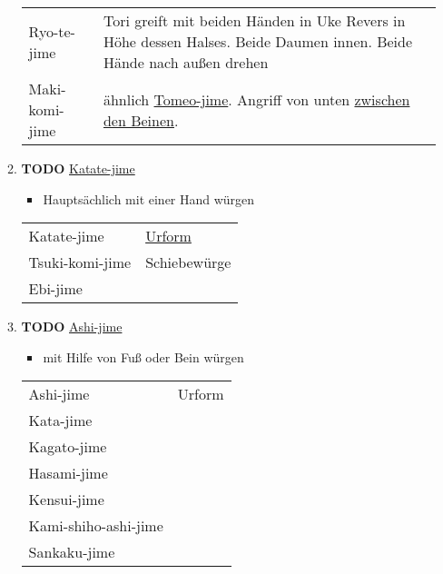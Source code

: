 \documentclass[11pt]{article}
\begin{document}
\begin{enumerate}
\begin{enumerate}
\begin{center}
\begin{tabular}{ll}
\label{org4d43bbc}Ryo-te-jime & Tori greift mit beiden Händen in Uke Revers in Höhe dessen Halses. Beide Daumen innen. Beide Hände nach außen drehen\\
\label{orgaf130ed}Maki-komi-jime & ähnlich \hyperref[org76eba16]{Tomeo-jime}. Angriff von unten \hyperref[orgd3451e7]{zwischen den Beinen}.\\
\end{tabular}
\end{center}

\item {\bfseries\sffamily TODO} \hyperref[org5205198]{Katate-jime}
\label{sec:orgaaa1370}

\begin{itemize}
\item Hauptsächlich mit einer Hand würgen
\end{itemize}

\begin{center}
\begin{tabular}{ll}
\label{org5205198}Katate-jime & \href{https://www.youtube.com/watch?v=aKEQKdlSjlE}{Urform}\\
\label{org1fce139}Tsuki-komi-jime & \label{org0b2eb1a}Schiebewürge\\
\label{org380b150}Ebi-jime & \\
\end{tabular}
\end{center}

\item {\bfseries\sffamily TODO} \hyperref[org5e2c0a8]{Ashi-jime}
\label{sec:org8f4671d}

\begin{itemize}
\item mit Hilfe von Fuß oder Bein würgen
\end{itemize}

\begin{center}
\begin{tabular}{ll}
\label{org5e2c0a8}Ashi-jime & Urform\\
\label{orge50870b}Kata-jime & \\
\label{org6a85f6d}Kagato-jime & \\
\label{org4c71131}Hasami-jime & \\
\label{orgc7f9485}Kensui-jime & \\
\label{org64c6b3b}Kami-shiho-ashi-jime & \\
\label{org0af0618}Sankaku-jime & \\
\end{tabular}
\end{center}
\end{enumerate}


\end{enumerate}
\end{document}
